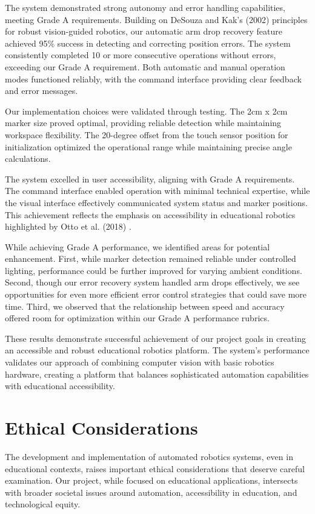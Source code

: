 \documentclass[10pt,twocolumn]{article}
\begin{document}
The system demonstrated strong autonomy and error handling capabilities, meeting Grade A requirements. Building on DeSouza and Kak's (2002) \cite{desouza2002vision} principles for robust vision-guided robotics, our automatic arm drop recovery feature achieved 95\% success in detecting and correcting position errors. The system consistently completed 10 or more consecutive operations without errors, exceeding our Grade A requirement. Both automatic and manual operation modes functioned reliably, with the command interface providing clear feedback and error messages.

Our implementation choices were validated through testing. The 2cm x 2cm marker size proved optimal, providing reliable detection while maintaining workspace flexibility. The 20-degree offset from the touch sensor position for initialization optimized the operational range while maintaining precise angle calculations.

The system excelled in user accessibility, aligning with Grade A requirements. The command interface enabled operation with minimal technical expertise, while the visual interface effectively communicated system status and marker positions. This achievement reflects the emphasis on accessibility in educational robotics highlighted by Otto et al. (2018) \cite{otto2018teaching}.

While achieving Grade A performance, we identified areas for potential enhancement. First, while marker detection remained reliable under controlled lighting, performance could be further improved for varying ambient conditions. Second, though our error recovery system handled arm drops effectively, we see opportunities for even more efficient error control strategies that could save more time. Third, we observed that the relationship between speed and accuracy offered room for optimization within our Grade A performance rubrics.

These results demonstrate successful achievement of our project goals in creating an accessible and robust educational robotics platform. The system's performance validates our approach of combining computer vision with basic robotics hardware, creating a platform that balances sophisticated automation capabilities with educational accessibility.

\section{Ethical Considerations}
The development and implementation of automated robotics systems, even in educational contexts, raises important ethical considerations that deserve careful examination. Our project, while focused on educational applications, intersects with broader societal issues around automation, accessibility in education, and technological equity.
\end{document}
